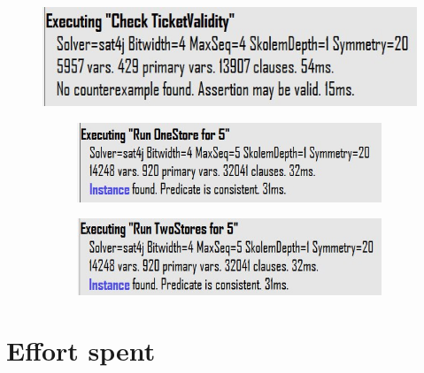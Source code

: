 \documentclass[]{article}
\begin{document}
			\begin{figure}[H]

								\includegraphics[scale=0.9]{TicketValidity.jpg}
										\begin{figure}[H]

								\includegraphics[scale=0.9]{OneStorePred.jpg}
								
	\end{figure}
			\begin{figure}[H]

								\includegraphics[scale=0.9]{TwoStoresPred.jpg}
								
	\end{figure}
								
	\end{figure}

	
	\section{Effort spent}
	
\end{document}
